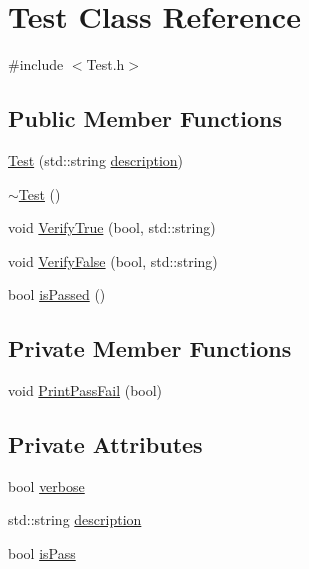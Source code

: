 \hypertarget{classTest}{\section{Test Class Reference}
\label{classTest}
}


{\ttfamily \#include $<$Test.\+h$>$}

\subsection*{Public Member Functions}
\begin{DoxyCompactItemize}
\item 
\hyperlink{classTest_aa1a8488c06a34269437ee3d97819d619}{Test} (std\+::string \hyperlink{classTest_a9452136cd882a23b8e52f5b2a82a5bb3}{description})
\item 
\hyperlink{classTest_a2b0a62f1e667bbe8d8cb18d785bfa991}{$\sim$\+Test} ()
\item 
void \hyperlink{classTest_aa7b8f1adb896473e046835503af76c1d}{Verify\+True} (bool, std\+::string)
\item 
void \hyperlink{classTest_a719a8eb78ad30689d4b1292d8ed8c6e0}{Verify\+False} (bool, std\+::string)
\item 
bool \hyperlink{classTest_ae10143e79951d45bd6137ed399d7b37a}{is\+Passed} ()
\end{DoxyCompactItemize}
\subsection*{Private Member Functions}
\begin{DoxyCompactItemize}
\item 
void \hyperlink{classTest_a260fb2b7ed4b913d8e205aa097e7bf18}{Print\+Pass\+Fail} (bool)
\end{DoxyCompactItemize}
\subsection*{Private Attributes}
\begin{DoxyCompactItemize}
\item 
bool \hyperlink{classTest_ab02c0c474b2a636c948baf761df0b3c5}{verbose}
\item 
std\+::string \hyperlink{classTest_a9452136cd882a23b8e52f5b2a82a5bb3}{description}
\item 
bool \hyperlink{classTest_a91d1d78671cfc2b974b6ae3c8a88f25d}{is\+Pass}
\end{DoxyCompactItemize}


